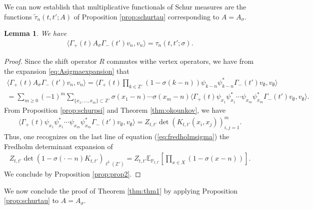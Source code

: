 \documentclass[12pt]{amsart}
\newtheorem{lem}[thm]{Lemma}
\theoremstyle{definition}
\renewcommand{\P}{\mathbb{P}}
\newcommand{\Z}{\mathbb{Z}}
\newcommand{\E}{\mathbb{E}}
\begin{document}
We can now establish that multiplicative functionals of Schur measures are the functions $\tilde{\tau}_n(t,t';A)$ of Proposition \ref{prop:schurtau} corresponding to $A=A_\sigma$.
\begin{lem} \label{lem:expansion}
    We have
\begin{align*}
\langle \Gamma_+( t) A_\sigma \Gamma_-(t') v_n ,v_n \rangle = \tau_n(t,t';\sigma).
\end{align*}
\end{lem}
\begin{proof}
Since the shift operator $R$ commutes withe vertex operators, we have from the expansion \eqref{eq:Asigmaexpansion} that
\begin{multline} \label{eq:fredholmsigma}
\langle \Gamma_+( t) A_\sigma \Gamma_-(t') v_n ,v_n \rangle = \langle \Gamma_+(t) \prod_{ k \in \Z'} (1-\sigma(k-n)) \psi_{k-n} \psi_{k-n}^* \Gamma_-(t') v_\emptyset, v_{\emptyset} \rangle \\
= \sum_{m \geq 0} (-1)^m \sum_{ \{x_1, \dots,x_m \} \subset \Z'} \sigma(x_1-n) \cdots  \sigma(x_m-n ) \langle \Gamma_+(t)  \psi_{x_1} \psi_{x_1}^* \cdots \psi_{x_m} \psi_{x_m}^* \Gamma_-(t') v_\emptyset , v_\emptyset\rangle.
\end{multline}
From Proposition \ref{prop:schurpsi} and Theorem \ref{thm:okounkov}, we have
\begin{align*}
\langle \Gamma_+(t)  \psi_{x_1} \psi_{x_1}^* \cdots \psi_{x_m} \psi_{x_m}^* \Gamma_-(t') v_\emptyset , v_\emptyset\rangle = Z_{t,t'} \det \left( K_{t,t'}  (x_i,x_j) \right)_{i,j=1}^m.
\end{align*}
Thus, one recognizes on the last line of equation (\ref{eq:fredholmsigma}) the Fredholm determinant expansion of
\begin{align*}
Z_{t,t'} \det \left( 1- \sigma( \cdot - n ) K_{t,t'}  \right)_{\ell^2(\Z')} =Z_{t,t'} \E_{\P_{t,t'}} \left[ \prod_{x \in X} (1- \sigma(x-n) )\right].
\end{align*}
We conclude by Proposition \ref{prop:prop2}.
\end{proof}
We now conclude the proof of Theorem \ref{thm:thm1} by applying Proposition \ref{prop:schurtau} to $A= A_\sigma$.
\end{document}
